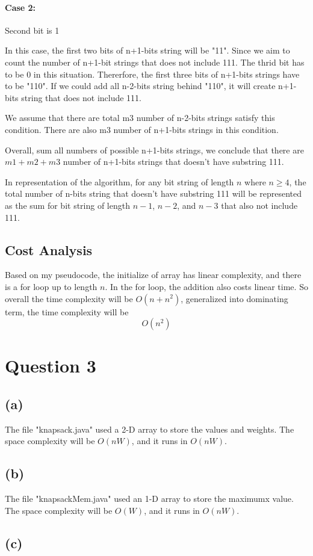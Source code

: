 \documentclass{article}
\begin{document}
\paragraph*{Case 2:} Second bit is 1

In this case, the first two bits of n+1-bits string will be "11". Since we aim to count the number of n+1-bit strings
that does not include 111. The thrid bit has to be 0 in this situation. Thererfore, the first three bits of n+1-bits strings 
have to be "110". If we could add all n-2-bits string behind "110", it will create n+1-bits string that does not include 111.

We assume that there are total m3 number of n-2-bits strings satisfy this condition. There are also m3 number of n+1-bits strings
in this condition.

Overall, sum all numbers of possible n+1-bits strings, we conclude that there are $m1+m2+m3$ number of n+1-bits strings
that doesn't have substring 111.

In representation of the algorithm, for any bit string of length $n$ where $n \geq 4$, the total number of n-bits string that 
doesn't have substring 111 will be represented as the sum for bit string of length $n-1$, $n-2$, and $n-3$ that also not include 111.

\subsection*{Cost Analysis}

Based on my pseudocode, the initialize of array has linear complexity, and there is a for loop up to length $n$. In the for loop, the addition also costs linear time.
So overall the time complexity will be $O(n+n^2)$, generalized into dominating term, the time complexity will be 
$$O(n^2)$$


\section*{Question 3}
\subsection*{(a)}

The file "knapsack.java" used a 2-D array to store the values and weights.
The space complexity will be $O(nW)$, and it runs in $O(nW)$.
\subsection*{(b)}

The file "knapsackMem.java" used an 1-D array to store the maximumx value.
The space complexity will be $O(W)$, and it runs in $O(nW)$.
\subsection*{(c)}
\end{document}
